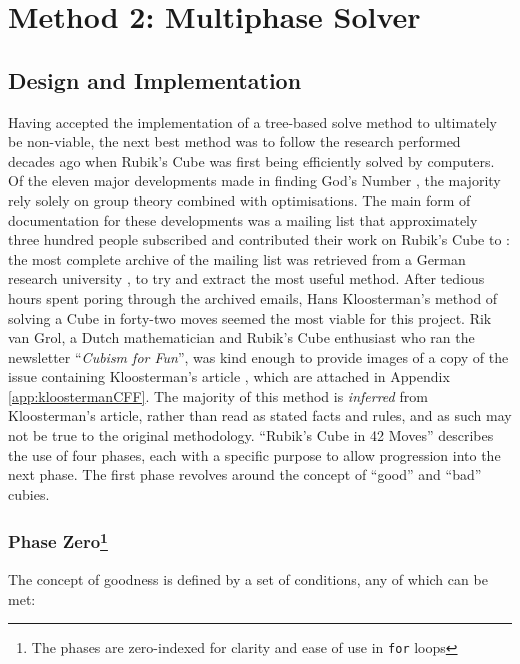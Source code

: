 \documentclass{report}
\newcommand{\tit}[1]{\textit{#1}}
\newcommand{\propernoun}[1]{\enquote{\tit{#1}}}
\begin{document}
	\section{Method 2: Multiphase Solver} \label{sec:multiphaseSolving}
	
	\subsection{Design and Implementation}
	
	Having accepted the implementation of a tree-based solve method to ultimately be non-viable, the next best method was to follow the research performed decades ago when Rubik's Cube was first being efficiently solved by computers. Of the eleven major developments made in finding God's Number \cite{Rokicki2010}, the majority rely solely on group theory combined with optimisations. The main form of documentation for these developments was a mailing list that approximately three hundred people subscribed and contributed their work on Rubik's Cube to \cite{Schoenert1996}: the most complete archive of the mailing list was retrieved from a German research university \cite{Schoenert1996}, \cite{RWTHAachenUniversity} to try and extract the most useful method. After tedious hours spent poring through the archived emails, Hans Kloosterman's method of solving a Cube in forty-two moves seemed the most viable for this project. Rik van Grol, a Dutch mathematician and Rubik's Cube enthusiast who ran the newsletter \propernoun{Cubism for Fun}, was kind enough to provide images of a copy of the issue containing Kloosterman's article \cite{Kloosterman1990}, which are attached in Appendix \ref{app:kloostermanCFF}.	The majority of this method is \tit{inferred} from Kloosterman's article, rather than read as stated facts and rules, and as such may not be true to the original methodology. \enquote{Rubik's Cube in 42 Moves} describes the use of four phases, each with a specific purpose to allow progression into the next phase. The first phase revolves around the concept of \enquote{good} and \enquote{bad} cubies. 
	
	\subsubsection[Phase Zero]{Phase Zero\protect\footnote{The phases are zero-indexed for clarity and ease of use in \lstinline|for| loops}}
	
	The concept of goodness is defined by a set of conditions, any of which can be met:
	
\end{document}
